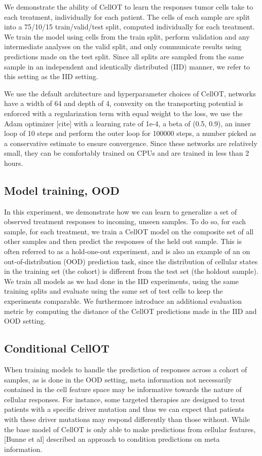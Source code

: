 We demonstrate the ability of CellOT to learn the responses tumor cells take to each treatment, individually for each patient. The cells of each sample are split into a 75/10/15 train/valid/test split, computed individually for each treatment. We train the model using cells from the train split, perform validation and any intermediate analyses on the valid split, and only communicate results using predictions made on the test split. Since all splits are sampled from the same sample in an independent and identically distributed (IID) manner, we refer to this setting as the IID setting.

We use the default architecture and hyperparameter choices of CellOT, networks have a width of 64 and depth of 4, convexity on the transporting potential is enforced with a regularization term with equal weight to the loss, we use the Adam optimizer [cite] with a learning rate of 1e-4, a beta of (0.5, 0.9), an inner loop of 10 steps and perform the outer loop for 100000 steps, a number picked as a conservative estimate to ensure convergence. Since these networks are relatively small, they can be comfortably trained on CPUs and are trained in less than 2 hours. 

\subsection{Model training, OOD}
In this experiment, we demonstrate how we can learn to generalize a set of observed treatment responses to incoming, unseen samples. To do so,  for each sample, for each treatment, we train a CellOT model on the composite set of all other samples and then predict the responses of the held out sample. This is often referred to as a hold-one-out experiment, and is also an example of an on out-of-distribution (OOD) prediction task, since the distribution of cellular states in the training set (the cohort) is different from the test set (the holdout sample). We train all models as we had done in the IID experiments, using the same training splits and evaluate using the same set of test cells to keep the experiments comparable.  We furthermore introduce an additional evaluation metric by computing the distance of the CellOT predictions made in the IID and OOD setting.

\subsection{Conditional CellOT}
When training models to handle the prediction of responses across a cohort of samples, as is done in the OOD setting, meta information not necessarily contained in the cell feature space may be informative towards the nature of cellular responses. For instance, some targeted therapies are designed to treat patients with a specific driver mutation and thus we can expect that patients with these driver mutations may respond differently than those without. While the base model of CellOT is only able to make predictions from cellular features, [Bunne et al] described an approach to condition predictions on meta information.

